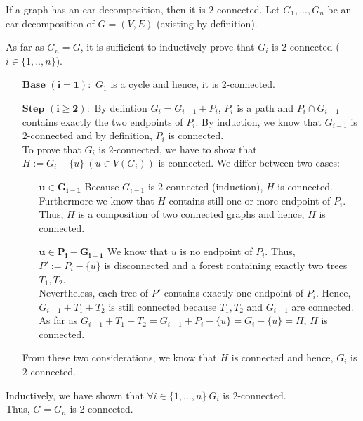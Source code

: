 \documentclass[a4paper]{article}
\begin{document}
	\begin{solution}{13}
		\begin{theorem}{If a graph has an ear-decomposition, then it is $2$-connected.}
				Let $G_1,...,G_n$ be an ear-decomposition of $G=(V,E)$ (existing by definition).

				As far as $G_n=G$, it is sufficient to inductively prove that $G_i$ is $2$-connected ($i \in \{1,..,n\}$).
				\begin{itemize}
					\item[$\mathbf{\text{Base }(i=1):} $]
						$G_1$ is a cycle and hence, it is 2-connected.
						
					\item[$\mathbf{\text{Step }(i \geq 2):}$]
						By defintion $G_i=G_{i-1} + P_i$, $P_i$ is a path and $P_i \cap G_{i-1}$ contains exactly the two endpoints of $P_i$. By induction, we know that $G_{i-1}$ is $2$-connected and by definition, $P_i$ is connected.\\

						To prove that $G_i$ is $2$-connected, we have to show that $H := G_i-\{u\} ~ (u \in V(G_i))$ is connected. We differ between two cases:
						\begin{itemize}
							\item[$\mathbf{u \in G_{i-1}} $]
								Because $G_{i-1}$ is $2$-connected (induction), $H$ is connected.\\
								Furthermore we know that $H$ contains still one or more endpoint of $P_i$.\\
								Thus, $H$ is a composition of two connected graphs and hence, $H$ is connected.
						
							\item[$\mathbf{u \in P_i - G_{i-1} } $]
								We know that $u$ is no endpoint of $P_i$. Thus, $P':=P_i-\{u\}$ is disconnected and a forest containing exactly two trees $T_1, T_2$.\\
								Nevertheless, each tree of $P'$ contains exactly one endpoint of $P_i$.
								Hence, $G_{i-1} + T_1 + T_2$ is still connected because $T_1, T_2$ and $G_{i-1}$ are connected.
								As far as $G_{i-1} + T_1 + T_2 = G_{i-1} + P_i - \{u\} = G_i - \{u\} = H$, $H$ is connected.
						\end{itemize}
						
						From these two considerations, we know that $H$ is connected and hence, $G_i$ is $2$-connected.			
				\end{itemize}
				Inductively, we have shown that $\forall i \in \{1,...,n\} ~ G_i$ is $2$-connected.\\
				Thus, $G=G_n$ is $2$-connected.\\
		\end{theorem}
	\end{solution}
\end{document}
